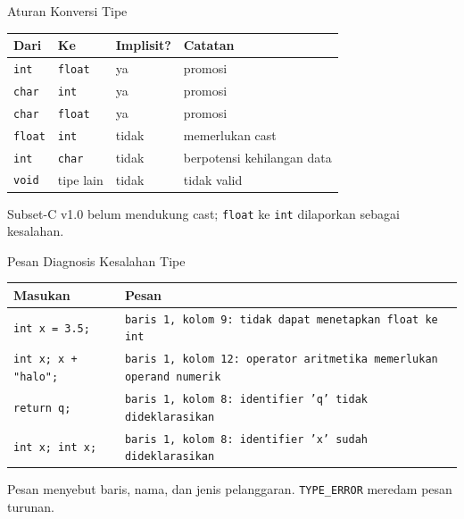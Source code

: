 \documentclass[aspectratio=169,10pt,t]{beamer}
\begin{document}
\begin{frame}{Aturan Konversi Tipe}
  \scriptsize
  \setlength{\tabcolsep}{4pt}
  \begin{tabular}{@{}p{2.4cm}p{2.4cm}p{2.4cm}p{5.4cm}@{}}
    \toprule
    \textbf{Dari} & \textbf{Ke} & \textbf{Implisit?} &
      \textbf{Catatan} \\
    \midrule
    \texttt{int} & \texttt{float} & ya & promosi \\
    \texttt{char} & \texttt{int} & ya & promosi \\
    \texttt{char} & \texttt{float} & ya & promosi \\
    \texttt{float} & \texttt{int} & tidak & memerlukan cast \\
    \texttt{int} & \texttt{char} & tidak & berpotensi kehilangan data \\
    \texttt{void} & tipe lain & tidak & tidak valid \\
    \bottomrule
  \end{tabular}

  \vspace{4pt}
  {\scriptsize\color{ubbblue!75}Subset-C v1.0 belum mendukung cast;
  \texttt{float} ke \texttt{int} dilaporkan sebagai kesalahan.}
\end{frame}

\begin{frame}{Pesan Diagnosis Kesalahan Tipe}
  \scriptsize
  \setlength{\tabcolsep}{4pt}
  \begin{tabular}{@{}p{4.2cm}p{9.0cm}@{}}
    \toprule
    \textbf{Masukan} & \textbf{Pesan} \\
    \midrule
    \texttt{int x = 3.5;} &
      \texttt{baris 1, kolom 9: tidak dapat menetapkan float ke int} \\
    \texttt{int x; x + "halo";} &
      \texttt{baris 1, kolom 12: operator aritmetika memerlukan operand
      numerik} \\
    \texttt{return q;} &
      \texttt{baris 1, kolom 8: identifier 'q' tidak dideklarasikan} \\
    \texttt{int x; int x;} &
      \texttt{baris 1, kolom 8: identifier 'x' sudah dideklarasikan} \\
    \bottomrule
  \end{tabular}

  \vspace{4pt}
  {\scriptsize\color{ubbblue!75}Pesan menyebut baris, nama, dan jenis
  pelanggaran. \texttt{TYPE\_ERROR} meredam pesan turunan.}
\end{frame}
\end{document}
